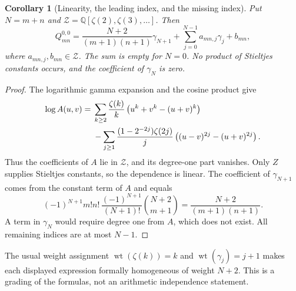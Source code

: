\documentclass[11pt,a4paper]{article}
\numberwithin{equation}{section}
\newtheorem{corollary}[theorem]{Corollary}
\theoremstyle{definition}
\newcommand{\Q}{\mathbb Q}
\begin{document}
\begin{corollary}[Linearity, the leading index, and the missing index]\label{csc:gap}
Put $N=m+n$ and $\mathcal Z=\Q[\zeta(2),\zeta(3),\ldots]$. Then
\begin{equation}\label{csc:gapformula}
Q_{mn}^{0,0}=\frac{N+2}{(m+1)(n+1)}\gamma_{N+1}
+\sum_{j=0}^{N-1}a_{mn,j}\gamma_j+b_{mn},
\end{equation}
where $a_{mn,j},b_{mn}\in\mathcal Z$. The sum is empty for $N=0$. No product of Stieltjes constants occurs, and the coefficient of $\gamma_N$ is zero.
\end{corollary}
\begin{proof}
The logarithmic gamma expansion \cite{csc:DLMFgamma} and the cosine product give
\begin{align}
\log A(u,v)={}&\sum_{k\ge2}\frac{\zeta(k)}k\left(u^k+v^k-(u+v)^k\right)\notag\\
&-\sum_{j\ge1}\frac{(1-2^{-2j})\zeta(2j)}j
\left((u-v)^{2j}-(u+v)^{2j}\right).\label{csc:logA}
\end{align}
Thus the coefficients of $A$ lie in $\mathcal Z$, and its degree-one part vanishes. Only $Z$ supplies Stieltjes constants, so the dependence is linear. The coefficient of $\gamma_{N+1}$ comes from the constant term of $A$ and equals
\[
(-1)^{N+1}m!n!\,
\frac{(-1)^{N+1}}{(N+1)!}\binom{N+2}{m+1}
=\frac{N+2}{(m+1)(n+1)}.
\]
A term in $\gamma_N$ would require degree one from $A$, which does not exist. All remaining indices are at most $N-1$.
\end{proof}
The usual weight assignment $\operatorname{wt}(\zeta(k))=k$ and $\operatorname{wt}(\gamma_j)=j+1$ makes each displayed expression formally homogeneous of weight $N+2$. This is a grading of the formulas, not an arithmetic independence statement.
\end{document}
